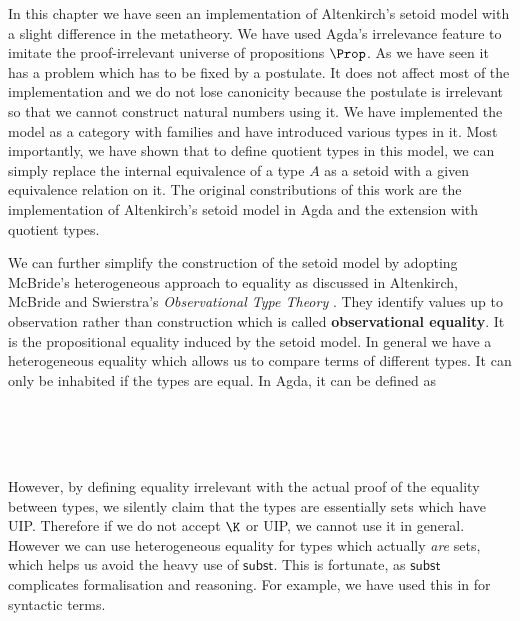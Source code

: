 In this chapter we have seen an implementation of Altenkirch's setoid model with a slight difference in the metatheory. 
We have used Agda's irrelevance feature to imitate the proof-irrelevant universe of propositions $\Prop$. 
As we have seen it has a problem which has to be fixed by a postulate. It does not affect most of the implementation and we do not lose canonicity because the postulate is irrelevant so that we cannot construct natural numbers using it. We have implemented the model as a category with families and have introduced various types in it. Most importantly, we have shown that to define quotient types in this model, we can simply replace the internal equivalence of a type $A$ as a setoid with a given equivalence relation on it. The original constributions of this work are the implementation of Altenkirch's setoid model in Agda and the extension with quotient types. 

We can further simplify the construction of the setoid model by adopting McBride's heterogeneous approach to equality as discussed in Altenkirch, McBride and Swierstra's \emph{Observational Type Theory} \cite{alti:ott-conf}. They identify values up to observation rather than construction which is called \textbf{observational equality}. It is the propositional equality induced by the setoid model.  In general we have a heterogeneous equality which allows us to compare terms of different types. It can only be inhabited if the types are equal. In Agda, it can be defined as

\begin{code}
\\
\>  \AgdaSymbol{\{} \AgdaSymbol{:} \AgdaSymbol{\}} \AgdaSymbol{(} \AgdaSymbol{:} \AgdaSymbol{)} \AgdaSymbol{:}  \AgdaSymbol{:} \AgdaSymbol{\}}     \<%
\\
\>[0]\<[2]%
\>[2] \AgdaSymbol{:}   \<%
\\
\end{code}


However, by defining equality irrelevant with the actual proof of the equality between types, we silently claim that the types are essentially sets which have UIP. Therefore if we do not accept $\K$ or UIP, we cannot use it in general. However we can use heterogeneous equality for types which actually \emph{are} sets, which helps us avoid the heavy use of $\mathsf{subst}$.
This is fortunate, as $\mathsf{subst}$ complicates formalisation and reasoning.
For example, we have used this in  for syntactic terms.








